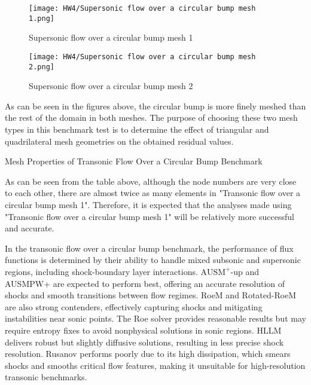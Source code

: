 \documentclass[a4paper, 12pt]{article}
\begin{document}
\begin{figure}[H]
    \centering
    \texttt{[image: HW4/Supersonic flow over a circular bump mesh 1.png]}
    \caption{Supersonic flow over a circular bump mesh 1}
\end{figure}


\begin{figure}[H]
    \centering
    \texttt{[image: HW4/Supersonic flow over a circular bump mesh 2.png]}
    \caption{Supersonic flow over a circular bump mesh 2}
\end{figure}

As can be seen in the figures above, the circular bump is more finely meshed than the rest of the domain in both meshes. The purpose of choosing these two mesh types in this benchmark test is to determine the effect of triangular and quadrilateral mesh geometries on the obtained residual values.

\begin{table}[H]
    \renewcommand\baselinestretch{1.1}\selectfont
    \centering
    \mbox{}
    \caption{Mesh Properties of Transonic Flow Over a Circular Bump Benchmark}
\end{table}

As can be seen from the table above, although the node numbers are very close to each other, there are almost twice as many elements in "Transonic flow over a circular bump mesh 1". Therefore, it is expected that the analyses made using "Transonic flow over a circular bump mesh 1" will be relatively more successful and accurate.\\\par
In the transonic flow over a circular bump benchmark, the performance of flux functions is determined by their ability to handle mixed subsonic and supersonic regions, including shock-boundary layer interactions. $\text{AUSM}^+\text{-up}$ and AUSMPW+ are expected to perform best, offering an accurate resolution of shocks and smooth transitions between flow regimes. RoeM and Rotated-RoeM are also strong contenders, effectively capturing shocks and mitigating instabilities near sonic points. The Roe solver provides reasonable results but may require entropy fixes to avoid nonphysical solutions in sonic regions. HLLM delivers robust but slightly diffusive solutions, resulting in less precise shock resolution. Rusanov performs poorly due to its high dissipation, which smears shocks and smooths critical flow features, making it unsuitable for high-resolution transonic benchmarks.\\\par
\end{document}
